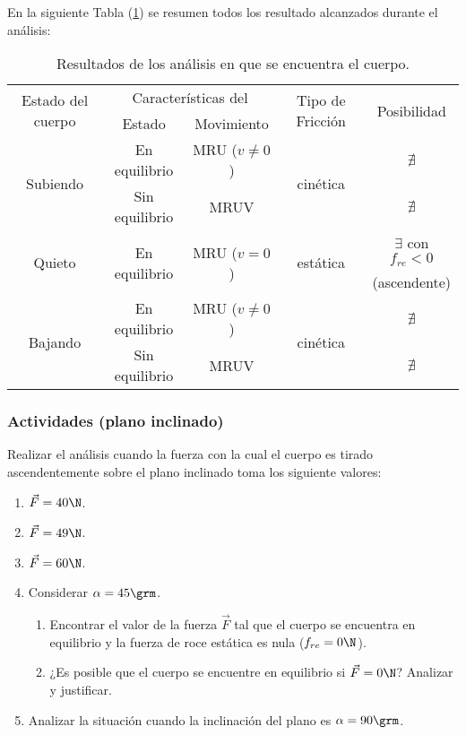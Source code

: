 
En la siguiente Tabla (\ref{t.resultado-pi}) se resumen todos los resultado
alcanzados durante el análisis:

\begin{table}[!h]
  \centering
\begin{tabular}{c|c|c|c|c}
  \hline\hline
  \multirow{2}{*}{Estado del cuerpo} & \multicolumn{2}{|c|}{Características del}
  & \multirow{2}{*}{Tipo de Fricción} & \multirow{2}{*}{Posibilidad} \\
  \cline{2-3}
  & Estado & Movimiento &\\
  \hline
  \multirow{2}{*}{Subiendo} & En equilibrio & MRU ($v\neq0$) &
  \multirow{2}{*}{cinética} & $\nexists$ \\
  & Sin equilibrio & MRUV && $\nexists$ \\
  \hline
  \multirow{2}{*}{Quieto} & \multirow{2}{*}{En equilibrio} & \multirow{2}{*}{MRU
  ($v=0$)} & \multirow{2}{*}{estática} & $\exists$ con $f_{re}<0$ \\
  &&&& (ascendente)\\
  \hline 
  \multirow{2}{*}{Bajando} & En equilibrio & MRU ($v\neq0$) &
  \multirow{2}{*}{cinética} & $\nexists$  \\
  & Sin equilibrio & MRUV && $\nexists$  \\
  \hline\hline
\end{tabular}
  \caption{Resultados de los análisis en que se encuentra el cuerpo.}
  \label{t.resultado-pi}
\end{table}


\subsubsection*{Actividades (plano inclinado)}
\small
Realizar el análisis cuando la fuerza con la cual el cuerpo es tirado
ascendentemente sobre el plano inclinado toma los siguiente valores: 
\begin{enumerate}
  \item $\vec{F}=40\N$.
  \item $\vec{F}=49\N$.
  \item $\vec{F}=60\N$.
  \item Considerar $\alpha=45\grm$.
    \begin{enumerate}
      \item Encontrar el valor de la fuerza $\vec{F}$ tal que el cuerpo se
	encuentra en equilibrio y la fuerza de roce estática es nula
	($f_{re}=0\N$).
      \item ¿Es posible que el cuerpo se encuentre en equilibrio si
	$\vec{F}=0\N$? Analizar y justificar.
    \end{enumerate}
  \item Analizar la situación cuando la inclinación del plano es
  $\alpha=90\grm$.
\end{enumerate}
\normalsize


